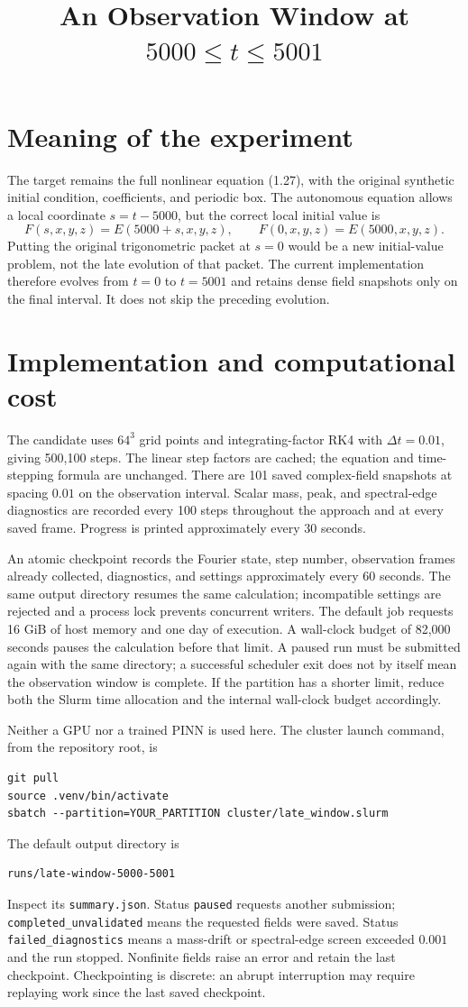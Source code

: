 \documentclass[11pt]{article}
\title{An Observation Window at $5000\leq t\leq5001$}
\author{}\date{}
\begin{document}
\maketitle
\section{Meaning of the experiment}
The target remains the full nonlinear equation (1.27), with the original synthetic initial condition, coefficients, and periodic box. The autonomous equation allows a local coordinate $s=t-5000$, but the correct local initial value is
\[
F(s,x,y,z)=E(5000+s,x,y,z),\qquad F(0,x,y,z)=E(5000,x,y,z).
\]
Putting the original trigonometric packet at $s=0$ would be a new initial-value problem, not the late evolution of that packet. The current implementation therefore evolves from $t=0$ to $t=5001$ and retains dense field snapshots only on the final interval. It does not skip the preceding evolution.
\section{Implementation and computational cost}
The candidate uses $64^3$ grid points and integrating-factor RK4 with $\Delta t=0.01$, giving 500,100 steps. The linear step factors are cached; the equation and time-stepping formula are unchanged. There are 101 saved complex-field snapshots at spacing $0.01$ on the observation interval. Scalar mass, peak, and spectral-edge diagnostics are recorded every 100 steps throughout the approach and at every saved frame. Progress is printed approximately every 30 seconds.

An atomic checkpoint records the Fourier state, step number, observation frames already collected, diagnostics, and settings approximately every 60 seconds. The same output directory resumes the same calculation; incompatible settings are rejected and a process lock prevents concurrent writers. The default job requests 16 GiB of host memory and one day of execution. A wall-clock budget of 82,000 seconds pauses the calculation before that limit. A paused run must be submitted again with the same directory; a successful scheduler exit does not by itself mean the observation window is complete. If the partition has a shorter limit, reduce both the Slurm time allocation and the internal wall-clock budget accordingly.

Neither a GPU nor a trained PINN is used here. The cluster launch command, from the repository root, is
\begin{verbatim}
git pull
source .venv/bin/activate
sbatch --partition=YOUR_PARTITION cluster/late_window.slurm
\end{verbatim}
The default output directory is
\begin{verbatim}
runs/late-window-5000-5001
\end{verbatim}
Inspect its \texttt{summary.json}. Status \texttt{paused} requests another submission; \texttt{completed\_unvalidated} means the requested fields were saved. Status \texttt{failed\_diagnostics} means a mass-drift or spectral-edge screen exceeded $0.001$ and the run stopped. Nonfinite fields raise an error and retain the last checkpoint. Checkpointing is discrete: an abrupt interruption may require replaying work since the last saved checkpoint.
\end{document}
